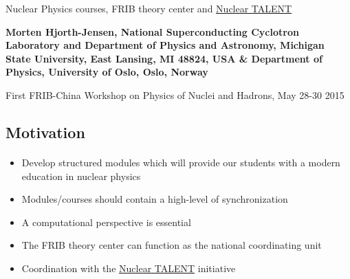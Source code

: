 \documentclass[%
twoside,                 %
final,                   %
10pt]{article}
\begin{document}






\thispagestyle{empty}

\begin{center}
{\LARGE\bf
\begin{spacing}{1.25}
Nuclear Physics courses, FRIB theory center and \href{{http://www.nucleartalent.org}}{Nuclear TALENT}
\end{spacing}
}
\end{center}


\begin{center}
{\bf Morten Hjorth-Jensen, National Superconducting Cyclotron Laboratory and Department of Physics and Astronomy, Michigan State University, East Lansing, MI 48824, USA {\&} Department of Physics, University of Oslo, Oslo, Norway${}^{}$} \\ [0mm]
\end{center}

    \begin{center}
\end{center}
    

\begin{center} %
First FRIB-China Workshop on Physics of Nuclei and Hadrons, May 28-30 2015
\end{center}

\vspace{1cm}


\subsection*{Motivation}

\paragraph{}
\begin{itemize}
\item Develop structured modules which will provide our students with a modern education in nuclear physics

\item Modules/courses should contain a high-level of synchronization

\item A computational perspective is essential

\item The FRIB theory center can function as the national coordinating unit

\item Coordination with the \href{{http://www.nucleartalent.org}}{Nuclear TALENT} initiative
\end{itemize}
\end{document}
